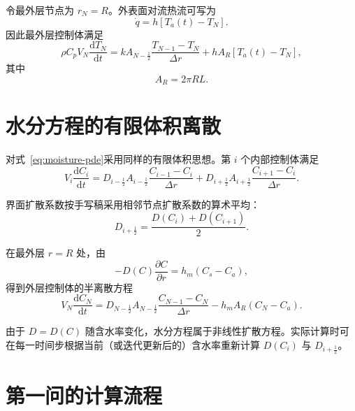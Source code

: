 \documentclass[UTF8,a4paper,12pt]{ctexart}
\begin{document}
令最外层节点为 $r_N=R$。外表面对流热流可写为
\begin{equation}
    \dot q
    =
    h\left[T_a(t)-T_N\right].
\end{equation}
因此最外层控制体满足
\begin{equation}
    \rho C_pV_N\frac{\mathrm{d}T_N}{\mathrm{d}t}
    =
    kA_{N-\frac12}
    \frac{T_{N-1}-T_N}{\Delta r}
    +
    hA_R\left[T_a(t)-T_N\right],
    \label{eq:outer-temp}
\end{equation}
其中
\begin{equation}
    A_R=2\pi RL.
\end{equation}

\section{水分方程的有限体积离散}

对式~\eqref{eq:moisture-pde}采用同样的有限体积思想。第 $i$ 个内部控制体满足
\begin{equation}
    V_i\frac{\mathrm{d}C_i}{\mathrm{d}t}
    =
    D_{i-\frac12}A_{i-\frac12}
    \frac{C_{i-1}-C_i}{\Delta r}
    +
    D_{i+\frac12}A_{i+\frac12}
    \frac{C_{i+1}-C_i}{\Delta r}.
    \label{eq:moisture-fvm}
\end{equation}

界面扩散系数按手写稿采用相邻节点扩散系数的算术平均：
\begin{equation}
    D_{i+\frac12}
    =
    \frac{D(C_i)+D(C_{i+1})}{2}.
    \label{eq:D-interface}
\end{equation}

在最外层 $r=R$ 处，由
\begin{equation}
    -D(C)\frac{\partial C}{\partial r}
    =
    h_m(C_s-C_a),
\end{equation}
得到外层控制体的半离散方程
\begin{equation}
    V_N\frac{\mathrm{d}C_N}{\mathrm{d}t}
    =
    D_{N-\frac12}A_{N-\frac12}
    \frac{C_{N-1}-C_N}{\Delta r}
    -
    h_mA_R(C_N-C_a).
    \label{eq:outer-moisture}
\end{equation}

由于 $D=D(C)$ 随含水率变化，水分方程属于非线性扩散方程。实际计算时可在每一时间步根据当前（或迭代更新后的）含水率重新计算 $D(C_i)$ 与 $D_{i+\frac12}$。

\section{第一问的计算流程}
\end{document}
